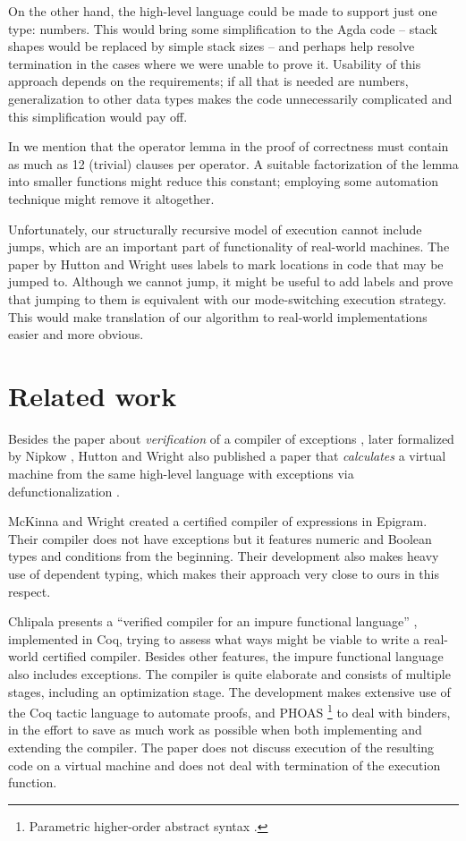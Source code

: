 On the other hand, the high-level language could be made to support just one type: numbers.
This would bring some simplification to the Agda code -- stack shapes would be replaced by
simple stack sizes -- and perhaps help resolve termination
in the cases where we were unable to prove it. Usability of this approach depends on the
requirements; if all that is needed are numbers, generalization to other data types makes
the code unnecessarily complicated and this simplification would pay off.

In  we mention that the operator lemma in the proof of correctness
must contain as much as 12 (trivial) clauses per operator. A suitable factorization of the
lemma into smaller functions might reduce this constant; employing some automation technique
might remove it altogether.

Unfortunately, our structurally recursive model of execution cannot include jumps, which are an
important part of functionality of real-world machines. The paper by Hutton and Wright
\cite{gmh:exceptions} uses labels to mark locations in code that may be jumped to. Although
we cannot jump, it might be useful to add labels and prove that jumping to them is
equivalent with our mode-switching execution strategy. This would make translation
of our algorithm to real-world implementations easier and more obvious.

\section{Related work}

Besides the paper about \emph{verification} of a compiler of exceptions
\cite{gmh:exceptions}, later formalized by Nipkow \cite{nipkow}, Hutton and Wright also published a
paper that \emph{calculates} a virtual machine from the same high-level language with exceptions
via defunctionalization \cite{gmh:exceptional-machine}.

McKinna and Wright created a certified compiler of expressions \cite{epigram-compiler} in Epigram.
Their compiler does not have exceptions but it features numeric and Boolean types and
conditions from the beginning. Their development also makes heavy use of dependent typing,
which makes their approach very close to ours in this respect.

Chlipala presents a ``verified compiler for an impure functional language'' \cite{chlipala10},
implemented in Coq, trying to assess what ways might be viable to write a real-world certified
compiler. Besides other features, the impure functional language also includes
exceptions. The compiler is quite elaborate and consists of multiple stages, including
an optimization stage. The development makes extensive use of the Coq
tactic language to automate proofs, and PHOAS%
\footnote{Parametric higher-order abstract syntax \cite{chlipala08}.} to deal with binders,
in the effort to save as much work as possible when both implementing and extending
the compiler. The paper does not discuss execution of the resulting code on a virtual machine
and does not deal with termination of the execution function.

